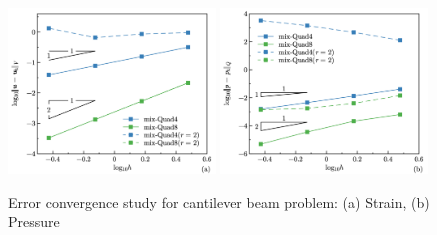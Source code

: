 \begin{figure}[H]
\centering
\includegraphics[width=0.49\textwidth]{png/cantilever_Hdev.png}
\includegraphics[width=0.49\textwidth]{png/cantilever_L2_p.png}
\caption{Error convergence study for cantilever beam problem: (a) Strain, (b) Pressure}\label{fg:cantilever_convergence}
\end{figure}
